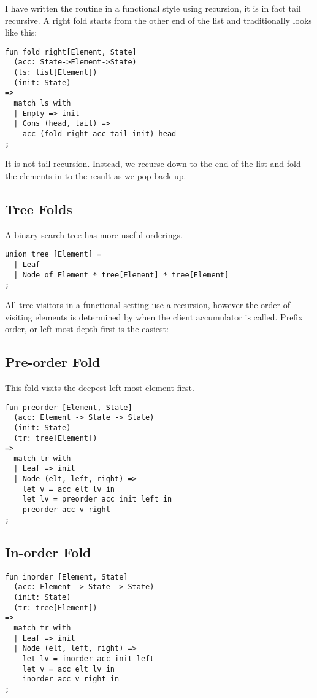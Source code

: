 \documentclass[oneside]{book}
\begin{document}
I have written the routine in a functional style using recursion,
it is in fact tail recursive. A right fold starts from the other
end of the list and traditionally looks like this:

\begin{verbatim}
fun fold_right[Element, State] 
  (acc: State->Element->State)
  (ls: list[Element])
  (init: State)
=>
  match ls with
  | Empty => init
  | Cons (head, tail) =>
    acc (fold_right acc tail init) head
;
\end{verbatim}

It is not tail recursion. Instead, we recurse down to the end of
the list and fold the elements in to the result as we pop back up.

\subsection{Tree Folds}
A binary search tree has more useful orderings. 

\begin{verbatim}
union tree [Element] =
  | Leaf
  | Node of Element * tree[Element] * tree[Element]
;
\end{verbatim}

All tree visitors in a functional setting use a recursion, 
however the order of visiting elements is determined by when the 
client accumulator is called. Prefix order, or left most depth first is the easiest:

\subsection{Pre-order Fold}
This fold visits the deepest left most element first.

\begin{verbatim}
fun preorder [Element, State]
  (acc: Element -> State -> State)
  (init: State)
  (tr: tree[Element])
=>
  match tr with
  | Leaf => init
  | Node (elt, left, right) =>
    let v = acc elt lv in
    let lv = preorder acc init left in
    preorder acc v right
;
\end{verbatim}

\subsection{In-order Fold}

\begin{verbatim}
fun inorder [Element, State]
  (acc: Element -> State -> State)
  (init: State)
  (tr: tree[Element])
=>
  match tr with
  | Leaf => init
  | Node (elt, left, right) =>
    let lv = inorder acc init left
    let v = acc elt lv in
    inorder acc v right in
;
\end{verbatim}
\end{document}
